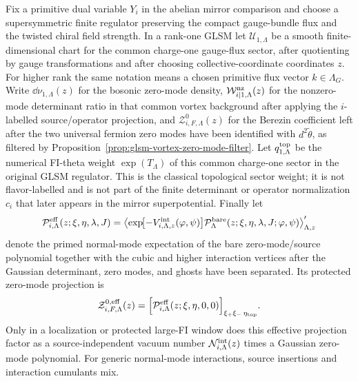 \begin{proposition}
\label{prop:glsm-single-vortex-exponential-amplitude}
Fix a primitive dual variable \(Y_i\) in the abelian mirror comparison and
choose a supersymmetric finite regulator preserving the compact gauge-bundle
flux and the twisted chiral field strength.  In a rank-one GLSM let
\(\mathcal U_{1,\Lambda}\) be a smooth finite-dimensional chart for the common
charge-one gauge-flux sector, after quotienting by gauge transformations and
after choosing collective-coordinate coordinates \(z\).  For higher rank the
same notation means a chosen primitive flux vector \(k\in\Lambda_G\).  Write
\(\dd\nu_{1,\Lambda}(z)\) for the bosonic zero-mode density,
\(\mathcal W_{i|1,\Lambda}^{\rm nz}(z)\) for the nonzero-mode determinant
ratio in that common vortex background after applying the \(i\)-labelled
source/operator projection, and
\(\mathcal Z_{i,F,\Lambda}^{0}(z)\) for the Berezin coefficient left after
the two universal fermion zero modes have been identified with
\(d^2\widetilde\theta\), as filtered by
Proposition~\ref{prop:glsm-vortex-zero-mode-filter}.  Let
\(q^{\rm top}_{1,\Lambda}\) be the numerical FI-theta weight
\(\exp(T_\Lambda)\) of this common charge-one sector in the original GLSM
regulator.  This is the classical topological sector weight; it is not
flavor-labelled and is not part of the finite determinant or operator
normalization \(c_i\) that later appears in the mirror superpotential.
Finally let
\[
  \mathcal P^{\rm eff}_{i,\Lambda}(z;\xi,\eta,\lambda,J)
  =
  \left\langle
    \exp\!\bigl[-V^{\rm int}_{i,\Lambda,z}(\varphi,\psi)\bigr]
    \mathcal P^{\rm bare}_{\Lambda}
      (z;\xi,\eta,\lambda,J;\varphi,\psi)
  \right\rangle'_{\Lambda,z}
\]
denote the primed normal-mode expectation of the bare zero-mode/source
polynomial together with the cubic and higher interaction vertices after the
Gaussian determinant, zero modes, and ghosts have been separated.  Its
protected zero-mode projection is
\[
  \mathcal Z^{0,{\rm eff}}_{i,F,\Lambda}(z)
  =
  \Bigl[
    \mathcal P^{\rm eff}_{i,\Lambda}(z;\xi,\eta,0,0)
  \Bigr]_{\xi_+\xi_-\,\eta_{\rm top}} .
\]
Only in a localization or protected large-FI window does this effective
projection factor as a source-independent vacuum number
\(\mathcal N^{\rm int}_{i,\Lambda}(z)\) times a Gaussian zero-mode polynomial.
For generic normal-mode interactions, source insertions and interaction
cumulants mix.


\end{proposition}
